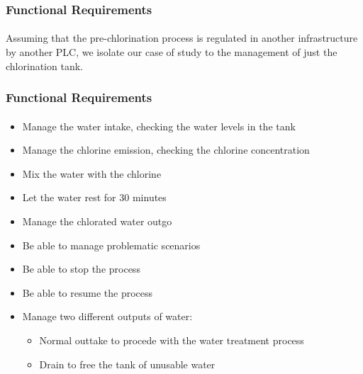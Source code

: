\documentclass[12pt]{beamer}
\begin{document}
\begin{frame}
\frametitle{Functional Requirements}
\framesubtitle{}
Assuming that the pre-chlorination process is regulated in another infrastructure by another PLC, we isolate our case of study to the management of just the chlorination tank.
\end{frame}

\begin{frame}
\frametitle{Functional Requirements}
\framesubtitle{}
\begin{itemize}
    \item Manage the water intake, checking the water levels in the tank
    \item Manage the chlorine emission, checking the chlorine concentration
    \item Mix the water with the chlorine
    \item Let the water rest for 30 minutes
    \item Manage the chlorated water outgo
    \item Be able to manage problematic scenarios
    \item Be able to stop the process
    \item Be able to resume the process
    \item Manage two different outputs of water:
    \begin{itemize}
        \item Normal outtake to procede with the water treatment process
        \item Drain to free the tank of unusable water
    \end{itemize}
\end{itemize}
\end{frame}
\end{document}
